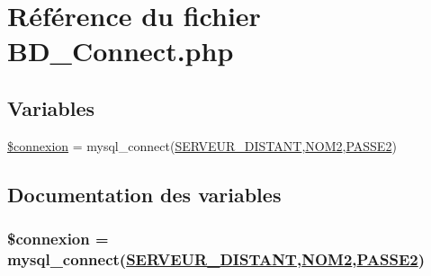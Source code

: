 \hypertarget{BD__Connect_8php}{
\section{R\'{e}f\'{e}rence du fichier BD\_\-Connect.php}
\label{BD__Connect_8php}
}
\subsection*{Variables}
\begin{CompactItemize}
\item 
\hyperlink{BD__Connect_8php_a0}{\$connexion} = mysql\_\-connect(\hyperlink{pma__connect_8php_a6}{SERVEUR\_\-DISTANT},\hyperlink{pma__connect_8php_a4}{NOM2},\hyperlink{pma__connect_8php_a5}{PASSE2})
\end{CompactItemize}


\subsection{Documentation des variables}
\hypertarget{BD__Connect_8php_a0}{
\subsubsection[\$connexion]{\setlength{\rightskip}{0pt plus 5cm}\$connexion = mysql\_\-connect(\hyperlink{pma__connect_8php_a6}{SERVEUR\_\-DISTANT},\hyperlink{pma__connect_8php_a4}{NOM2},\hyperlink{pma__connect_8php_a5}{PASSE2})}}
\label{BD__Connect_8php_a0}


